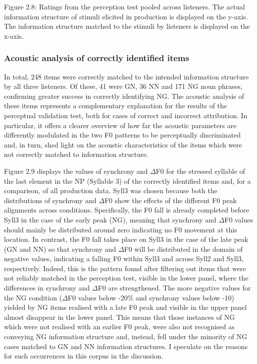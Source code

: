 \begin{stylecaption}
Figure 2.8: Ratings from the perception test pooled across listeners. The actual information structure of stimuli elicited in production is displayed on the y-axis. The information structure matched to the stimuli by listeners is displayed on the x-axis. 
\end{stylecaption}

\subsubsection[Acoustic analysis of correctly identified items]{Acoustic analysis of correctly identified items}
\hypertarget{Toc191305903}{}\begin{styleStandard}
In total, 248 items were correctly matched to the intended information structure by all three listeners. Of these, 41 were GN, 36 NN and 171 NG noun phrases, confirming greater success in correctly identifying NG. The acoustic analysis of these items represents a complementary explanation for the results of the perceptual validation test, both for cases of correct and incorrect attribution. In particular, it offers a clearer overview of how far the acoustic parameters are differently modulated in the two F0 patterns to be perceptually discriminated and, in turn, shed light on the acoustic characteristics of the items which were not correctly matched to information structure.
\end{styleStandard}

\begin{styleStandard}
Figure 2.9 displays the values of synchrony and ${\Delta}$F0 for the stressed syllable of the last element in the NP (Syllable 3) of the correctly identified items and, for a comparison, of all production data. Syll3 was chosen because both the distributions of synchrony and ${\Delta}$F0 show the effects of the different F0 peak alignments across conditions. Specifically, the F0 fall is already completed before Syll3 in the case of the early peak (NG), meaning that synchrony and ${\Delta}$F0 values should mainly be distributed around zero indicating no F0 movement at this location. In contrast, the F0 fall takes place on Syll3 in the case of the late peak (GN and NN) so that synchrony and ${\Delta}$F0 will be distributed in the domain of negative values, indicating a falling F0 within Syll3 and across Syll2 and Syll3, respectively. Indeed, this is the pattern found after filtering out items that were not reliably matched in the perception test, visible in the lower panel, where the differences in synchrony and ${\Delta}$F0 are strengthened. The more negative values for the NG condition (${\Delta}$F0 values below -20\% and synchrony values below -10) yielded by NG items realised with a late F0 peak and visible in the upper panel almost disappear in the lower panel. This means that those instances of NG which were not realised with an earlier F0 peak, were also not recognised as conveying NG information structure and, instead, fell under the minority of NG cases matched to GN and NN information structures. I speculate on the reasons for such occurrences in this corpus in the discussion.
\end{styleStandard}

